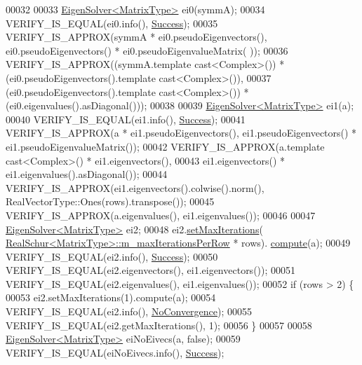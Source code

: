 \begin{DoxyCode}
00032 
00033   \hyperlink{group___eigenvalues___module_class_eigen_1_1_eigen_solver}{EigenSolver<MatrixType>} ei0(symmA);
00034   VERIFY\_IS\_EQUAL(ei0.info(), \hyperlink{group__enums_gga85fad7b87587764e5cf6b513a9e0ee5ea52581b035f4b59c203b8ff999ef5fcea}{Success});
00035   VERIFY\_IS\_APPROX(symmA * ei0.pseudoEigenvectors(), ei0.pseudoEigenvectors() * ei0.pseudoEigenvalueMatrix(
      ));
00036   VERIFY\_IS\_APPROX((symmA.template cast<Complex>()) * (ei0.pseudoEigenvectors().template cast<Complex>()),
00037     (ei0.pseudoEigenvectors().template cast<Complex>()) * (ei0.eigenvalues().asDiagonal()));
00038 
00039   \hyperlink{group___eigenvalues___module_class_eigen_1_1_eigen_solver}{EigenSolver<MatrixType>} ei1(a);
00040   VERIFY\_IS\_EQUAL(ei1.info(), \hyperlink{group__enums_gga85fad7b87587764e5cf6b513a9e0ee5ea52581b035f4b59c203b8ff999ef5fcea}{Success});
00041   VERIFY\_IS\_APPROX(a * ei1.pseudoEigenvectors(), ei1.pseudoEigenvectors() * ei1.pseudoEigenvalueMatrix());
00042   VERIFY\_IS\_APPROX(a.template cast<Complex>() * ei1.eigenvectors(),
00043                    ei1.eigenvectors() * ei1.eigenvalues().asDiagonal());
00044   VERIFY\_IS\_APPROX(ei1.eigenvectors().colwise().norm(), RealVectorType::Ones(rows).transpose());
00045   VERIFY\_IS\_APPROX(a.eigenvalues(), ei1.eigenvalues());
00046 
00047   \hyperlink{group___eigenvalues___module_class_eigen_1_1_eigen_solver}{EigenSolver<MatrixType>} ei2;
00048   ei2.\hyperlink{group___eigenvalues___module_a6cff220aadfd8d8c1366b915ddefd164}{setMaxIterations}(
      \hyperlink{group___eigenvalues___module_class_eigen_1_1_real_schur}{RealSchur<MatrixType>::m\_maxIterationsPerRow} * rows).
      \hyperlink{group___eigenvalues___module_a38d032b75b3e75640e3db42e7ab20c24}{compute}(a);
00049   VERIFY\_IS\_EQUAL(ei2.info(), \hyperlink{group__enums_gga85fad7b87587764e5cf6b513a9e0ee5ea52581b035f4b59c203b8ff999ef5fcea}{Success});
00050   VERIFY\_IS\_EQUAL(ei2.eigenvectors(), ei1.eigenvectors());
00051   VERIFY\_IS\_EQUAL(ei2.eigenvalues(), ei1.eigenvalues());
00052   \textcolor{keywordflow}{if} (rows > 2) \{
00053     ei2.setMaxIterations(1).compute(a);
00054     VERIFY\_IS\_EQUAL(ei2.info(), \hyperlink{group__enums_gga85fad7b87587764e5cf6b513a9e0ee5eaba1c8763d1179778070f365ecc4157a8}{NoConvergence});
00055     VERIFY\_IS\_EQUAL(ei2.getMaxIterations(), 1);
00056   \}
00057 
00058   \hyperlink{group___eigenvalues___module_class_eigen_1_1_eigen_solver}{EigenSolver<MatrixType>} eiNoEivecs(a, \textcolor{keyword}{false});
00059   VERIFY\_IS\_EQUAL(eiNoEivecs.info(), \hyperlink{group__enums_gga85fad7b87587764e5cf6b513a9e0ee5ea52581b035f4b59c203b8ff999ef5fcea}{Success});

\end{DoxyCode}
